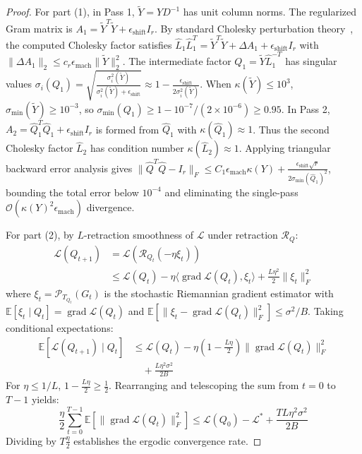 \documentclass[10pt,twocolumn,letterpaper]{article}
\begin{document}
\begin{proof}
For part (1), in Pass 1, $\tilde{Y} = Y D^{-1}$ has unit column norms. The regularized Gram matrix is $A_1 = \tilde{Y}^T \tilde{Y} + \epsilon_{\text{shift}} I_r$. By standard Cholesky perturbation theory~\cite{yamamoto2014roundoff}, the computed Cholesky factor satisfies $\hat{L}_1 \hat{L}_1^T = \tilde{Y}^T \tilde{Y} + \Delta A_1 + \epsilon_{\text{shift}} I_r$ with $\|\Delta A_1\|_2 \le c_r \epsilon_{\text{mach}} \|\tilde{Y}\|_2^2$. The intermediate factor $Q_1 = \tilde{Y} \hat{L}_1^{-T}$ has singular values $\sigma_i(Q_1) = \sqrt{\frac{\sigma_i^2(\tilde{Y})}{\sigma_i^2(\tilde{Y}) + \epsilon_{\text{shift}}}} \approx 1 - \frac{\epsilon_{\text{shift}}}{2 \sigma_i^2(\tilde{Y})}$. When $\kappa(\tilde{Y}) \le 10^3$, $\sigma_{\min}(\tilde{Y}) \ge 10^{-3}$, so $\sigma_{\min}(Q_1) \ge 1 - 10^{-7} / (2 \times 10^{-6}) \ge 0.95$. In Pass 2, $A_2 = \hat{Q}_1^T \hat{Q}_1 + \epsilon_{\text{shift}} I_r$ is formed from $\hat{Q}_1$ with $\kappa(\hat{Q}_1) \approx 1$. Thus the second Cholesky factor $\hat{L}_2$ has condition number $\kappa(\hat{L}_2) \approx 1$. Applying triangular backward error analysis gives $\| \hat{Q}^T \hat{Q} - I_r \|_F \le C_1 \epsilon_{\text{mach}} \kappa(Y) + \frac{\epsilon_{\text{shift}} \sqrt{r}}{2 \sigma_{\min}(\hat{Q}_1)^2}$, bounding the total error below $10^{-4}$ and eliminating the single-pass $\mathcal{O}(\kappa(Y)^2 \epsilon_{\text{mach}})$ divergence.

For part (2), by $L$-retraction smoothness of $\mathcal{L}$ under retraction $\mathcal{R}_Q$:
\begin{align}
    \mathcal{L}(Q_{t+1}) &= \mathcal{L}(\mathcal{R}_{Q_t}(-\eta \xi_t)) \nonumber \\
    &\le \mathcal{L}(Q_t) - \eta \langle \operatorname{grad} \mathcal{L}(Q_t), \xi_t \rangle + \frac{L \eta^2}{2} \| \xi_t \|_F^2
\end{align}
where $\xi_t = \mathcal{P}_{T_{Q_t}}(G_t)$ is the stochastic Riemannian gradient estimator with $\mathbb{E}[\xi_t \mid Q_t] = \operatorname{grad} \mathcal{L}(Q_t)$ and $\mathbb{E}[\|\xi_t - \operatorname{grad} \mathcal{L}(Q_t)\|_F^2] \le \sigma^2 / B$. Taking conditional expectations:
\begin{equation}
\begin{aligned}
    \mathbb{E}[\mathcal{L}(Q_{t+1}) \mid Q_t] &\le \mathcal{L}(Q_t) - \eta \left( 1 - \frac{L \eta}{2} \right) \| \operatorname{grad} \mathcal{L}(Q_t) \|_F^2 \\
    &\quad + \frac{L \eta^2 \sigma^2}{2 B}
\end{aligned}
\end{equation}
For $\eta \le 1/L$, $1 - \frac{L \eta}{2} \ge \frac{1}{2}$. Rearranging and telescoping the sum from $t = 0$ to $T-1$ yields:
\begin{equation}
    \frac{\eta}{2} \sum_{t=0}^{T-1} \mathbb{E}\left[ \| \operatorname{grad} \mathcal{L}(Q_t) \|_F^2 \right] \le \mathcal{L}(Q_0) - \mathcal{L}^* + \frac{T L \eta^2 \sigma^2}{2 B}
\end{equation}
Dividing by $T \frac{\eta}{2}$ establishes the ergodic convergence rate.
\end{proof}
\end{document}
